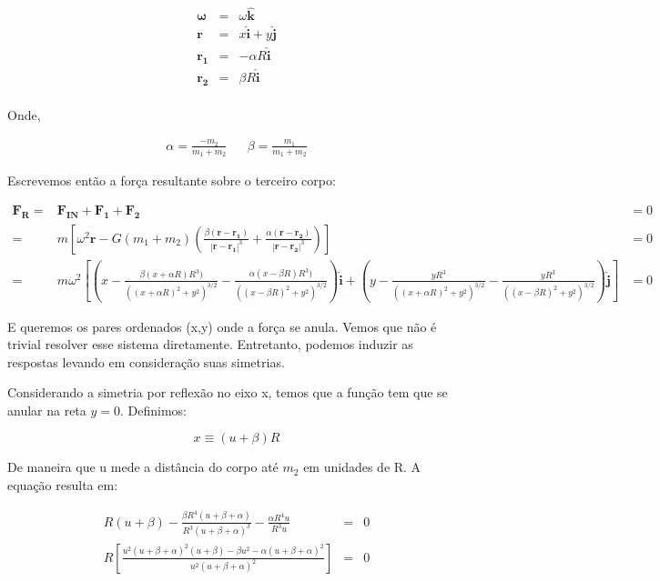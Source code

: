 \begin{eqnarray}
\boldsymbol{\omega} & = & \omega\mathbf{\hat{k}} \\
\mathbf{r} \; & = & x\mathbf{\hat{i}} + y\mathbf{\hat{j}} \\
\mathbf{r_1} & = & -\alpha R\mathbf{\hat{i}} \\
\mathbf{r_2} & = & \beta R\mathbf{\hat{i}} \\
\end{eqnarray}

Onde,

\begin{align}
\alpha = \frac{-m_2}{m_1+m_2} && \beta = \frac{m_1}{m_1+m_2}
\end{align}

Escrevemos então a força resultante sobre o terceiro corpo:

\begin{eqnarray}
\mathbf{F_R} = & \mathbf{F_{IN}} + \mathbf{F_1} + \mathbf{F_2} & = 0 \\
= & m\left[\omega^2\mathbf{r} -G(m_1+m_2)\left(\frac{\beta(\mathbf{r}-\mathbf{r_1})}{|\mathbf{r}-\mathbf{r_1}|^3} + \frac{\alpha(\mathbf{r}-\mathbf{r_2})}{|\mathbf{r}-\mathbf{r_2}|^3}\right) \right] & = 0 \\
= & m\omega^2 \left[\left(x - \frac{\beta(x+\alpha R) R^3)}{((x+\alpha R)^2 + y^2)^{3/2}} - \frac{\alpha(x-\beta R) R^3)}{((x-\beta R)^2 + y^2)^{3/2}}\right)\mathbf{\hat{i}} + \left(y - \frac{y R^3}{((x+\alpha R)^2 + y^2)^{3/2}} - \frac{y R^3}{((x-\beta R)^2 + y^2)^{3/2}}\right)\mathbf{\hat{j}}\right] & =0
\end{eqnarray}

E queremos os pares ordenados (x,y) onde a força se anula. Vemos que não é trivial resolver esse sistema diretamente. Entretanto, podemos induzir as respostas levando em consideração suas simetrias.

Considerando a simetria por reflexão no eixo x, temos que a função tem que se anular na reta $y=0$. Definimos:

\begin{equation}
x \equiv (u+\beta)R
\end{equation}

De maneira que u mede a distância do corpo até $m_2$ em unidades de R. A equação resulta em:

\begin{eqnarray}
R(u+\beta) - \frac{\beta R^4(u+\beta+\alpha)}{R^3(u+\beta+\alpha)^3}- \frac{\alpha R^4u}{R^3u} & = & 0 \\
R\left[\frac{u^2(u+\beta+\alpha)^2(u+\beta)-\beta u^2 - \alpha(u+\beta+\alpha)^2}{u^2(u+\beta+\alpha)^2}\right] & = & 0 \label{poliu}
\end{eqnarray}

